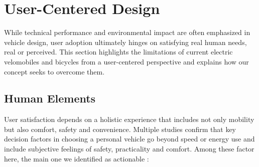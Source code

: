 \section{User-Centered Design}

While technical performance and environmental impact are often emphasized in vehicle design, user adoption ultimately hinges on satisfying real human needs, real or perceived. This section highlights the limitations of current electric velomobiles and bicycles from a user-centered perspective and explains how our concept seeks to overcome them.

\subsection{Human Elements}

User satisfaction depends on a holistic experience that includes not only mobility but also comfort, safety and convenience.
Multiple studies confirm that key decision factors in choosing a personal vehicle go beyond speed or energy use and include subjective feelings of safety, practicality and comfort. Among these factor here, the main one we identified as actionable :

